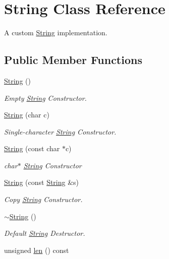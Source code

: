 \hypertarget{classString}{\section{String Class Reference}
\label{classString}
}


A custom \hyperlink{classString}{String} implementation.  


\subsection*{Public Member Functions}
\begin{DoxyCompactItemize}
\item 
\hyperlink{classString_a8a7ef356e05eb9b1ea1ab518baee3095}{String} ()
\begin{DoxyCompactList}\small\item\em Empty \hyperlink{classString}{String} Constructor. \end{DoxyCompactList}\item 
\hyperlink{classString_a1fdfe981d2c5e0075c1669dd94553082}{String} (char c)
\begin{DoxyCompactList}\small\item\em Single-\/character \hyperlink{classString}{String} Constructor. \end{DoxyCompactList}\item 
\hyperlink{classString_abd440c0a85756c6d4d24b64726933077}{String} (const char $\ast$c)
\begin{DoxyCompactList}\small\item\em char$\ast$ \hyperlink{classString}{String} Constructor \end{DoxyCompactList}\item 
\hyperlink{classString_a50ec7bf093552bdd2f467225c185490a}{String} (const \hyperlink{classString}{String} \&s)
\begin{DoxyCompactList}\small\item\em Copy \hyperlink{classString}{String} Constructor. \end{DoxyCompactList}\item 
\hyperlink{classString_ac40b2a3fb58c2d8556f5e6ff73510036}{$\sim$\-String} ()
\begin{DoxyCompactList}\small\item\em Default \hyperlink{classString}{String} Destructor. \end{DoxyCompactList}\item 
unsigned \hyperlink{classString_add33ec877ceeb9c9ba9e39e8dbd92890}{len} () const 

\end{DoxyCompactItemize}
